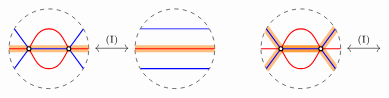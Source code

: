 \begin{figure}[ht]
\[
\begin{tikzcd}[row sep=0pc]
\begin{tikzpicture}[baseline=-.5ex]
\draw [dashed] (0,0) circle [radius=1];%
\clip (0,0) circle (1);
\draw [color=cyclecolor1, line cap=round, line width=5, opacity=0.5] (-1,0) to (1,0);
\draw [blue, thick] ({-sqrt(3)/2},1/2)--(-1/2,0);
\draw [blue, thick] ({-sqrt(3)/2},-1/2)--(-1/2,0);
\draw [blue, thick] ({sqrt(3)/2},1/2)--(1/2,0);
\draw [blue, thick] ({sqrt(3)/2},-1/2)--(1/2,0);
\draw [blue, thick] (-1/2,0)--(1/2,0);
\draw [red, thick] (-1,0)--(-1/2,0) to[out=60,in=180] (0,1/2) to[out=0,in=120] (1/2,0)--(1,0);
\draw [red, thick] (-1/2,0) to[out=-60,in=180] (0, -1/2) to[out=0, in=-120] (1/2,0); 
\draw[thick,black,fill=white] (-1/2,0) circle (0.05);
\draw[thick,black,fill=white] (1/2,0) circle (0.05);
\end{tikzpicture}
\arrow[leftrightarrow,r,"\Move{I}"]&
\begin{tikzpicture}[baseline=-.5ex]
\draw [dashed] (3,0) circle [radius=1];%
\clip (3,0) circle (1);
\draw [color=cyclecolor1, line cap=round, line width=5, opacity=0.5] (2,0) to (4,0);
\draw [blue, thick] ({3-sqrt(3)/2},1/2)--({3+sqrt(3)/2},1/2);
\draw [blue, thick] ({3-sqrt(3)/2},-1/2)--({3+sqrt(3)/2},-1/2);
\draw [red, thick] (2,0)--(4,0);
\end{tikzpicture}
&
\begin{tikzpicture}[baseline=-.5ex]
\draw [dashed] (0,0) circle [radius=1];%
\clip (0,0) circle (1);
\draw [color=cyclecolor1, line cap=round, line width=5, opacity=0.5] ({-sqrt(3)/2},1/2)--(-1/2,0) -- (1/2,0) --({sqrt(3)/2},1/2);
\begin{scope}[yscale=-1]
\draw [color=cyclecolor1, line cap=round, line width=5, opacity=0.5] ({-sqrt(3)/2},1/2)--(-1/2,0) -- (1/2,0) --({sqrt(3)/2},1/2);
\end{scope}
\draw [blue, thick] ({-sqrt(3)/2},1/2)--(-1/2,0);
\draw [blue, thick] ({-sqrt(3)/2},-1/2)--(-1/2,0);
\draw [blue, thick] ({sqrt(3)/2},1/2)--(1/2,0);
\draw [blue, thick] ({sqrt(3)/2},-1/2)--(1/2,0);
\draw [blue, thick] (-1/2,0)--(1/2,0);
\draw [red, thick] (-1,0)--(-1/2,0) to[out=60,in=180] (0,1/2) to[out=0,in=120] (1/2,0)--(1,0);
\draw [red, thick] (-1/2,0) to[out=-60,in=180] (0, -1/2) to[out=0, in=-120] (1/2,0); 
\draw[thick,black,fill=white] (-1/2,0) circle (0.05);
\draw[thick,black,fill=white] (1/2,0) circle (0.05);
\end{tikzpicture}
\arrow[leftrightarrow,r,"\Move{I}"]&
\begin{tikzpicture}[baseline=-.5ex]

\end{tikzpicture}
\end{tikzcd}\]
\end{figure}

